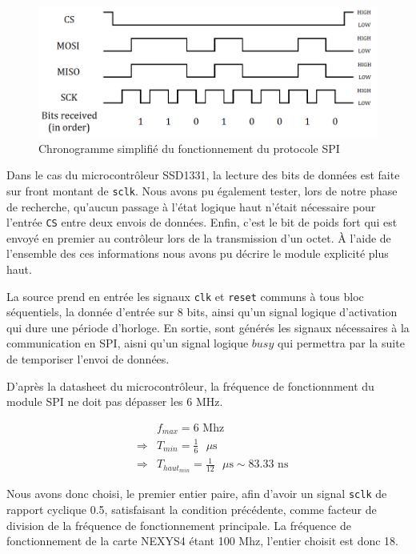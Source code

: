 \documentclass[11pt]{article}
\begin{document}
\begin{figure}[H]
\begin{center}
\includegraphics[scale = 0.32, keepaspectratio]{spi_signals.png}
\caption{Chronogramme simplifié du fonctionnement du protocole SPI \cite{spiimg}}
\end{center}
\end{figure}

Dans le cas du microcontrôleur SSD1331, la lecture des bits de données est faite sur front montant de \texttt{sclk}. Nous avons pu également tester, lors de notre phase de recherche, qu'aucun passage à l'état logique haut n'était nécessaire pour l'entrée \texttt{CS} entre deux envois de données. Enfin, c'est le bit de poids fort qui est envoyé en premier au contrôleur lors de la transmission d'un octet. À l'aide de l'ensemble des ces informations nous avons pu décrire le module explicité plus haut.

La source prend en entrée les signaux \texttt{clk} et \texttt{reset} communs à tous bloc séquentiels, la donnée d'entrée sur 8 bits, ainsi qu'un signal logique d'activation qui dure une période d'horloge. En sortie, sont générés les signaux nécessaires à la communication en SPI, aisni qu'un signal logique $busy$ qui permettra par la suite de temporiser l'envoi de données.

D'après la datasheet du microcontrôleur, la fréquence de fonctionnment du module SPI ne doit pas dépasser les 6 MHz.

\begin{eqnarray*}
&&f_{max} = 6\text{ Mhz}\\
&\Rightarrow&T_{min} = \frac{1}{6}\text{ }\mu\text{s}\\
&\Rightarrow&T_{haut_{min}} = \frac{1}{12}\text{ }\mu\text{s} \sim 83.33\text{ ns}
\end{eqnarray*}

Nous avons donc choisi, le premier entier paire, afin d'avoir un signal \texttt{sclk} de rapport cyclique 0.5, satisfaisant la condition précédente, comme facteur de division de la fréquence de fonctionnement principale. La fréquence de fonctionnement de la carte NEXYS4 étant 100 Mhz, l'entier choisit est donc 18.
\end{document}
